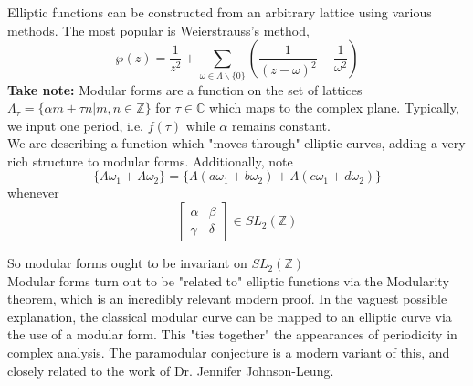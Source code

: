 \documentclass[11pt, oneside]{amsart}
\begin{document}
Elliptic functions can be constructed from an arbitrary lattice using various methods. The most popular is Weierstrauss's method, $$\wp(z)=\frac{1}{z^{2}}+\sum_{\omega \in \Lambda \backslash\{0\}}\left(\frac{1}{(z-\omega)^{2}}-\frac{1}{\omega^{2}}\right)$$
\textbf{Take note:} Modular forms are a function on the set of lattices $\Lambda_{\tau}=\{\alpha m + \tau n \vert m,n\in \mathbb{Z}\}$ for $\tau\in \mathbb{C}$ which maps to the complex plane. Typically, we input one period, i.e. $f(\tau)$ while $\alpha$ remains constant.\\
We are describing a function which "moves through" elliptic curves, adding a very rich structure to modular forms. Additionally,  note $$\{\Lambda\omega_{1}+\Lambda\omega_2\}=\{\Lambda(a \omega_{1}+b \omega_{2})+\Lambda(c \omega_{1}+d \omega_{2})\}$$ whenever \[
\begin{bmatrix}

\alpha &	\beta \\
\gamma & \delta

\end{bmatrix}
\in SL_2(\mathbb{Z})
\]

So modular forms ought to be invariant on $SL_2(\mathbb{Z})$\\
Modular forms turn out to be "related to" elliptic functions via the Modularity theorem, which is an incredibly relevant modern proof. In the vaguest possible explanation, the classical modular curve can be mapped to an elliptic curve via the use of a modular form. This "ties together" the appearances of periodicity in complex analysis. The paramodular conjecture is a modern variant of this, and closely related to the work of Dr. Jennifer Johnson-Leung.
\end{document}
